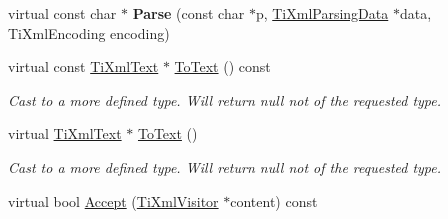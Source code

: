 \begin{DoxyCompactItemize}
\mbox{\label{class_ti_xml_text_a8d2dcfa41fc73d3e62dacc2fcf633819}} 
virtual const char $\ast$ {\bfseries Parse} (const char $\ast$p, \hyperlink{class_ti_xml_parsing_data}{Ti\+Xml\+Parsing\+Data} $\ast$data, Ti\+Xml\+Encoding encoding)
\item 
\mbox{\label{class_ti_xml_text_af8973cfd4ca00c5d934cb23e8aa0f5d5}} 
virtual const \hyperlink{class_ti_xml_text}{Ti\+Xml\+Text} $\ast$ \hyperlink{class_ti_xml_text_af8973cfd4ca00c5d934cb23e8aa0f5d5}{To\+Text} () const
\begin{DoxyCompactList}\small\item\em Cast to a more defined type. Will return null not of the requested type. \end{DoxyCompactList}\item 
\mbox{\label{class_ti_xml_text_ae7c3a8fd3e4dbf6c0c4363a943d72f5b}} 
virtual \hyperlink{class_ti_xml_text}{Ti\+Xml\+Text} $\ast$ \hyperlink{class_ti_xml_text_ae7c3a8fd3e4dbf6c0c4363a943d72f5b}{To\+Text} ()
\begin{DoxyCompactList}\small\item\em Cast to a more defined type. Will return null not of the requested type. \end{DoxyCompactList}\item 
virtual bool \hyperlink{class_ti_xml_text_af65964326eac4640bfb97d4622fa0de2}{Accept} (\hyperlink{class_ti_xml_visitor}{Ti\+Xml\+Visitor} $\ast$content) const
\end{DoxyCompactItemize}
